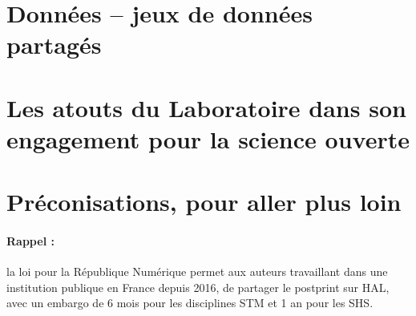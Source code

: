 \documentclass[french, 11pt]{dibiso/biso}
\begin{document}
\pagebreak

\section{Données – jeux de données partagés}







\pagebreak

\section{Les atouts du Laboratoire dans son engagement pour la science ouverte}








\section{Préconisations, pour aller plus loin}








\vfill

\paragraph{Rappel :} la loi pour la République Numérique permet aux auteurs travaillant dans une institution publique en France depuis 2016, de partager le postprint sur HAL, avec un embargo de 6 mois pour les disciplines STM et 1 an pour les SHS.


\makelastpagereport
 
\end{document}
